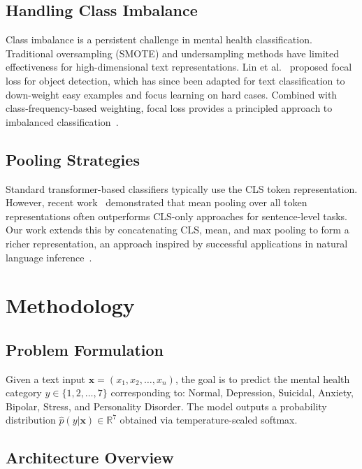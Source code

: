 \documentclass[conference, 10pt]{IEEEtran}
\begin{document}
\subsection{Handling Class Imbalance}

Class imbalance is a persistent challenge in mental health classification. Traditional oversampling (SMOTE) and undersampling methods have limited effectiveness for high-dimensional text representations. Lin et al.~\cite{lin2017focal} proposed focal loss for object detection, which has since been adapted for text classification to down-weight easy examples and focus learning on hard cases. Combined with class-frequency-based weighting, focal loss provides a principled approach to imbalanced classification~\cite{cui2019class}.

\subsection{Pooling Strategies}

Standard transformer-based classifiers typically use the CLS token representation. However, recent work~\cite{reimers2019sentencebert} demonstrated that mean pooling over all token representations often outperforms CLS-only approaches for sentence-level tasks. Our work extends this by concatenating CLS, mean, and max pooling to form a richer representation, an approach inspired by successful applications in natural language inference~\cite{conneau2017supervised}.


\section{Methodology}

\subsection{Problem Formulation}

Given a text input $\mathbf{x} = (x_1, x_2, \ldots, x_n)$, the goal is to predict the mental health category $y \in \{1, 2, \ldots, 7\}$ corresponding to: Normal, Depression, Suicidal, Anxiety, Bipolar, Stress, and Personality Disorder. The model outputs a probability distribution $\hat{p}(y|\mathbf{x}) \in \mathbb{R}^7$ obtained via temperature-scaled softmax.

\subsection{Architecture Overview}
\end{document}
